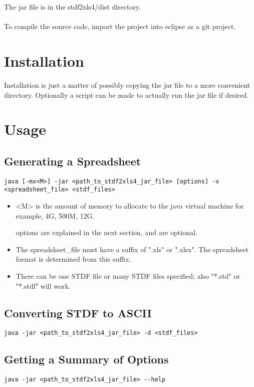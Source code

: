 \documentclass[letterpaper]{article}
\begin{document}
The jar file is in the stdf2xls4/dist directory.\\
\\
To compile the source code, import the project into eclipse as a git project.

\section{Installation}

Installation is just a matter of possibly copying the jar file to a more convenient
directory.  Optionally a script can be made to actually run the jar file if desired.

\section{Usage}

\subsection{Generating a Spreadsheet}
\begin{verbatim}
java [-mx<M>] -jar <path_to_stdf2xls4_jar_file> [options] -x <spreadsheet_file> <stdf_files>
\end{verbatim}
\begin{itemize}
\item <M> is the amount of memory to allocate to the java virtual machine for example, 4G, 500M, 12G.
\item [options] are explained in the next section, and are optional.
\item The spreadsheet\_file must have a suffix of ".xls" or ".xlsx".  The spreadsheet format is
determined from this suffix.
\item There can be one STDF file or many STDF files specified; also "*.std" or "*.stdf" will work.
\end{itemize}

\subsection{Converting STDF to ASCII}
\begin{verbatim}
java -jar <path_to_stdf2xls4_jar_file> -d <stdf_files>
\end{verbatim}

\subsection{Getting a Summary of Options}
\begin{verbatim}
java -jar <path_to_stdf2xls4_jar_file> --help
\end{verbatim}
\end{document}
